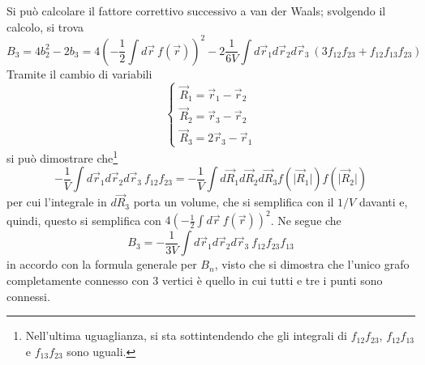 \documentclass[11pt, a4paper]{scrartcl}
\theoremstyle{style}
\theoremstyle{style1}
\numberwithin{equation}{subsection}
\begin{document}
Si pu\`o calcolare il fattore correttivo successivo a van der Waals; svolgendo il calcolo, si trova 
\[
B_3 = 4b_2^2 - 2 b_3 = 4 \left(-\frac{1}{2}\int d\vec{r} \ f(\vec{r})\right) ^2 - 2 \frac{1}{6V} \int d\vec{r}_1 d\vec{r}_2 d\vec{r}_3 \ \left(3 f_{12}f_{23} + f_{12}f_{13}f_{23}\right) 
\] 
Tramite il cambio di variabili 
\begin{equation}\label{cv}
\begin{cases}
	\vec{R}_1 = \vec{r}_1 - \vec{r}_2 \\
	\vec{R}_2 = \vec{r}_3 - \vec{r}_2\\
	\vec{R}_3 = 2  \vec{r}_3 - \vec{r}_1
\end{cases}
\end{equation}
si pu\`o dimostrare che\footnote{Nell'ultima uguaglianza, si sta sottintendendo che gli integrali di $f_{12}f_{23}$, $f_{12}f_{13}$ e $f_{13}f_{23}$ sono uguali.} 
\[
-\frac{1}{V} \int d\vec{r}_1 d\vec{r}_2 d\vec{r}_3 \ f_{12}f_{23} = -\frac{1}{V} \int d\vec{R}_1 d\vec{R}_2 d\vec{R}_3 f\left(\lvert \vec{R}_1 \rvert \right)  f\left(\lvert \vec{R}_2 \rvert \right) 
\] 
per cui l'integrale in $d\vec{R}_3$ porta un volume, che si semplifica con il $1 / V$ davanti e, quindi, questo si semplifica con $4 \left(-\frac{1}{2} \int d\vec{r} \ f(\vec{r})\right) ^2$. 
Ne segue che
\[
B_3 = -\frac{1}{3V} \int d\vec{r}_1 d\vec{r}_2 d\vec{r}_3 \ f_{12}f_{23}f_{13}
\] 
in accordo con la formula generale per $B_n$, visto che si dimostra che l'unico grafo completamente connesso con $3$ vertici \`e quello in cui tutti e tre i punti sono connessi.
\end{document}
